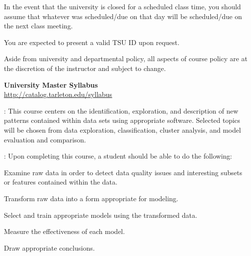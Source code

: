 \documentclass[letterpaper]{article}
\begin{document}
%


\bu[Notes]
\bit
  \item In the event that the university is closed for a scheduled class time, you should assume that whatever was scheduled/due on that day will be scheduled/due on the next class meeting.
  \item You are expected to present a valid TSU ID upon request.
  \item Aside from university and departmental policy, all aspects of course policy are at the discretion of the instructor and subject to change.
\eit

\hhrule

\begin{center}
\textbf{\LARGE{University Master Syllabus}}\\
\href{http://catalog.tarleton.edu/syllabus}{\underline{http://catalog.tarleton.edu/syllabus}}
\end{center}

\small
{}: This course centers on the identification, exploration, and description of new patterns contained within data sets using appropriate software. Selected topics will be chosen from data exploration, classification, cluster analysis, and model evaluation and comparison.

: Upon completing this course, a student should be able to do the following: 
\ben[a)]
\item Examine raw data in order to detect data quality issues and interesting subsets or features contained within the data.
\item Transform raw data into a form appropriate for modeling.
\item Select and train appropriate models using the transformed data.
\item Measure the effectiveness of each model.
\item Draw appropriate conclusions.
\een
\end{document}
